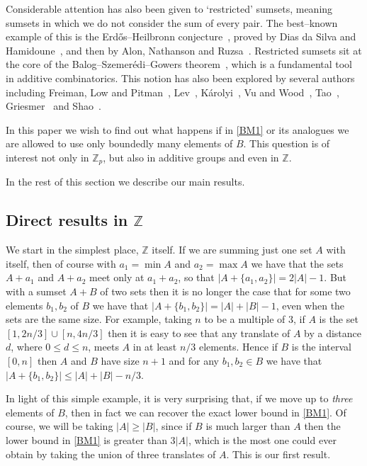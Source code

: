 \documentclass[12pt,reqno]{amsart}
\theoremstyle{definition}
\renewcommand\leq{\leqslant}
\renewcommand\geq{\geqslant}
\begin{document}
\vspace{5pt}
Considerable attention has also been given to `restricted' sumsets, meaning sumsets in which
we do not consider the sum of every pair. The best--known example of this is
the Erd\H{o}s--Heilbronn conjecture~\cite{ErdHeil}, proved by
Dias da Silva and Hamidoune~\cite{DiHa}, and then by Alon, Nathanson and Ruzsa~\cite{AlNaRu}. Restricted sumsets sit at the core
of the Balog--Szemer\'edi--Gowers theorem~\cite{BSG1,BSG2}, which is a fundamental tool in additive combinatorics. This notion
has also been explored by several authors including Freiman, Low and Pitman~\cite{FreLowPit99}, Lev~\cite{Lev-00a, Lev-00b, Lev-01}, K\'arolyi~\cite{Kar-05}, Vu and Wood~\cite{VuWood-09}, Tao~\cite{tao}, Griesmer~\cite{griesmers} and Shao~\cite{shao}.

\vspace{5pt}
In this paper we wish to find out what happens if in \eqref{BM1} or its analogues
we are allowed to use only boundedly many elements of $B$. This question is of
interest not only in ${\mathbb Z}_p$, but also in additive groups and even in ${\mathbb Z}$.

\vspace{5pt}
In the rest of this section we describe our main results.



\vspace{10pt}
\subsection{Direct results in $\mathbb{Z}$}
We start in the simplest place, ${\mathbb Z}$ itself. If we are summing just one set $A$ with
itself, then of course with $a_1 = \min A$ and $a_2 = \max A$ we have that the sets $A + a_1$ and
$A + a_2$ meet only at $a_1+a_2$, so that $|A+\{a_1,a_2\}| = 2 |A| - 1$. But with
a sumset $A+B$ of two sets then it is no longer the case that for some two elements $b_1,b_2$ of
$B$ we have that $|A+\{b_1,b_2\}| = |A|+|B| - 1$, even when the sets are the same size.
For example, taking $n$ to be a multiple of $3$, if $A$ is the set $[1,2n/3] \cup [n,4n/3]$ then it is easy to see that
any translate of $A$ by a distance $d$, where $0 \leq d \leq n$, meets $A$ in at least $n/3$
elements. Hence if $B$ is the interval $[0,n]$ then $A$ and $B$ have size $n+1$ and for any $b_1,b_2 \in B$ we have that
$|A+\{b_1,b_2\}| \leq |A|+|B|-n/3$.

\vspace{5pt}
In light of this simple example, it is very surprising that, if we move up to {\em three}
elements of $B$, then in fact we can recover the exact lower bound in \eqref{BM1}. Of course, we
will be taking $|A| \geq |B|$, since if $B$ is much larger than $A$ then the lower bound in
\eqref{BM1} is greater than $3 |A|$, which is the most one could ever obtain by taking the union of
three translates of $A$. This is our first result.
\end{document}
